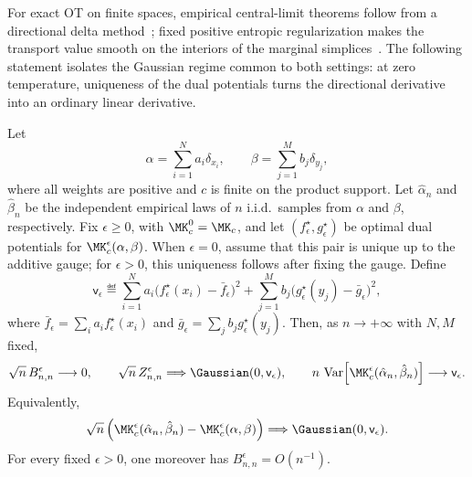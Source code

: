 For exact OT on finite spaces, empirical central-limit theorems follow from a directional delta method~\cite{sommerfeld2018inference,tameling2017empirical}; fixed positive entropic regularization makes the transport value smooth on the interiors of the marginal simplices~\cite{bigot2017central,klatt2020empirical,hundrieser2021limit,mena2019statistical}. The following statement isolates the Gaussian regime common to both settings: at zero temperature, uniqueness of the dual potentials turns the directional derivative into an ordinary linear derivative.

\begin{prop}\label{prop-finite-ot-clt}
	Let
	\[
		\alpha=\sum_{i=1}^{N}a_i\delta_{x_i},
		\qquad
		\beta=\sum_{j=1}^{M}b_j\delta_{y_j},
	\]
	where all weights are positive and \(c\) is finite on the product support. Let \(\hat\alpha_n\) and \(\hat\beta_n\) be the independent empirical laws of \(n\) i.i.d.\ samples from \(\alpha\) and \(\beta\), respectively. Fix \(\epsilon\geq0\), with \(\MK_c^0=\MK_c\), and let \((f_\epsilon^\star,g_\epsilon^\star)\) be optimal dual potentials for \(\MK_c^\epsilon(\alpha,\beta)\). When \(\epsilon=0\), assume that this pair is unique up to the additive gauge; for \(\epsilon>0\), this uniqueness follows after fixing the gauge. Define
	\[
		\mathsf{v}_\epsilon
		\eqdef
		\sum_{i=1}^{N}a_i\bigl(f_\epsilon^\star(x_i)-\bar f_\epsilon\bigr)^2
		+
		\sum_{j=1}^{M}b_j\bigl(g_\epsilon^\star(y_j)-\bar g_\epsilon\bigr)^2,
	\]
	where \(\bar f_\epsilon=\sum_i a_i f_\epsilon^\star(x_i)\) and \(\bar g_\epsilon=\sum_j b_j g_\epsilon^\star(y_j)\). Then, as \(n\to+\infty\) with \(N,M\) fixed,
	\[
		\sqrt n\,B_{n,n}^\epsilon\longrightarrow0,
		\qquad
		\sqrt n\,Z_{n,n}^\epsilon\Longrightarrow\Gaussian(0,\mathsf{v}_\epsilon),
		\qquad
		n\,\operatorname{Var}\!\left[\MK_c^\epsilon(\hat\alpha_n,\hat\beta_n)\right]
		\longrightarrow\mathsf{v}_\epsilon.
	\]
	Equivalently,
	\[
		\sqrt n\left(
		\MK_c^\epsilon(\hat\alpha_n,\hat\beta_n)
		-
		\MK_c^\epsilon(\alpha,\beta)
		\right)
		\Longrightarrow\Gaussian(0,\mathsf{v}_\epsilon).
	\]
	For every fixed \(\epsilon>0\), one moreover has \(B_{n,n}^\epsilon=O(n^{-1})\).
\end{prop}

